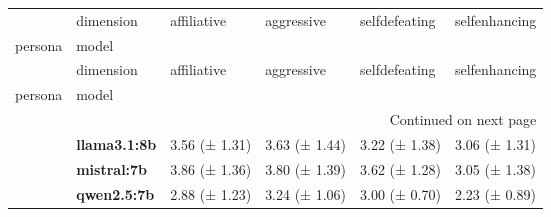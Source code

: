 \begin{longtable}{llllll}
\toprule
 & dimension & affiliative & aggressive & selfdefeating & selfenhancing \\
persona & model &  &  &  &  \\
\midrule
\endfirsthead
\toprule
 & dimension & affiliative & aggressive & selfdefeating & selfenhancing \\
persona & model &  &  &  &  \\
\midrule
\endhead
\midrule
\multicolumn{6}{r}{Continued on next page} \\
\midrule
\endfoot
\bottomrule
\endlastfoot
\multirow[t]{3}{*}{\textbf{base}} & \textbf{llama3.1:8b} & 3.56 (± 1.31) & 3.63 (± 1.44) & 3.22 (± 1.38) & 3.06 (± 1.31) \\
\textbf{} & \textbf{mistral:7b} & 3.86 (± 1.36) & 3.80 (± 1.39) & 3.62 (± 1.28) & 3.05 (± 1.38) \\
\textbf{} & \textbf{qwen2.5:7b} & 2.88 (± 1.23) & 3.24 (± 1.06) & 3.00 (± 0.70) & 2.23 (± 0.89) \\
\cline{1-6}
\end{longtable}
